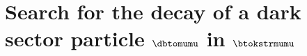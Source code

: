 \chapter
{Search for the decay of a dark sector particle
  \texorpdfstring{$\boldsymbol{\dbtomumu}$}{\dbtomumu} in
  \texorpdfstring{$\boldsymbol{\btokstrmumu}$}{\btokstrmumu}
}
\label{ch:db}





%



